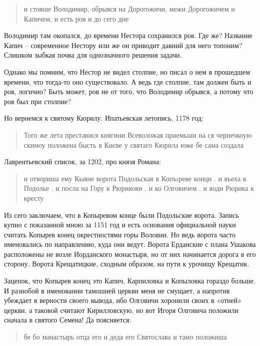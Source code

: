 \begin{quotation}
и стояше Володимир, обрывся на Дорогожичи, межи Дорогожичем и Капичем, и есть ров и до сего дне
\end{quotation}

Володимир там окопался, до времени Нестора сохранился ров. Где же? Название Капич – современное Нестору или же он приводит давний для него топоним? Слишком зыбкая почва для однозначного решения задачи.

Однако мы помним, что Нестор не видел столпие, но писал о нем в прошедшем времени, что тогда-то оно существовало. А ведь где столпие, там должен быть и ров, логично? Быть может, ров не от того, что Володимир обрывся, а потому что ров был при столпие? 

Но вернемся к святому Кюрилу. Ипатьевская летопись, 1178 год:

\begin{quotation}
Того же лета преставися княгини Всеволожая приемьши на ся чернечкоую скимоу положена бысть в Києве у святаго Кюрила юже бе сама создала
\end{quotation}

Лаврентьевский список, за 1202, про князя Романа:

\begin{quotation}
и отвориша ему Кыяне ворота Подольская в Копъıреве конци . и въеха в Подолье . и посла на Гору к Рюрикови . и ко Олговичем . и води Рюрика к кресту
\end{quotation}

Из сего заключаем, что в Копыревом конце были Подольские ворота. Запись купно с показанной мною за 1151 год и есть основания официальной науки считать Копырев конец окрестностями горы Воловни. Но ведь ворота часто именовались по направлению, куда они ведут. Ворота Ерданские с плана Ушакова расположены не возле Иорданского монастыря, но от них начинается дорога в его сторону. Ворота Крещатицкие, сходным образом, на пути к урочищу Крещатик. 

Зацепок, что Копырев конец это Капич, Карпиловка и Копыловка гораздо больше. И разнобой в именовании тамошней церкви меня не смущает, а напротив убеждает в верности своего вывода, ибо Олговичи хоронили своих в «отней» церкви, а таковой считают Кирилловскую, но вот Игоря Олговича положили сначала в святого Семена! Да поясняется:

\begin{quotation}
бе бо манастырь отца его и деда его Святослава и тамо положиша
\end{quotation}

